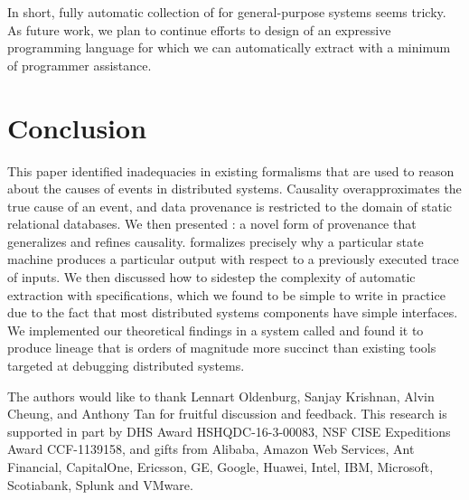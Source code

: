 In short, fully automatic collection of \watprovenance{} for general-purpose
systems seems tricky. As future work, we plan to continue efforts to design of
an expressive programming language for which we can automatically extract
\watprovenance{} with a minimum of programmer assistance.

\section{Conclusion}
This paper identified inadequacies in existing formalisms that are used to
reason about the causes of events in distributed systems. Causality
overapproximates the true cause of an event, and data provenance is restricted
to the domain of static relational databases.  We then presented
\watprovenance{}: a novel form of provenance that generalizes \whyprovenance{}
and refines causality. \Watprovenance{} formalizes precisely why a particular
state machine produces a particular output with respect to a previously
executed trace of inputs. We then discussed how to sidestep the complexity of
automatic \watprovenance{} extraction with \watprovenance{} specifications,
which we found to be simple to write in practice due to the fact that most
distributed systems components have simple interfaces. We implemented our
theoretical findings in a system called \fluent{} and found it to produce
lineage that is orders of magnitude more succinct than existing tools targeted
at debugging distributed systems.

\begin{acks}
  The authors would like to thank Lennart Oldenburg, Sanjay Krishnan, Alvin
  Cheung, and Anthony Tan for fruitful discussion and feedback.
  This research is supported in part by DHS Award HSHQDC-16-3-00083, NSF CISE
  Expeditions Award CCF-1139158, and gifts from Alibaba, Amazon Web Services, Ant
  Financial, CapitalOne, Ericsson, GE, Google, Huawei, Intel, IBM, Microsoft,
  Scotiabank, Splunk and VMware.
\end{acks}

